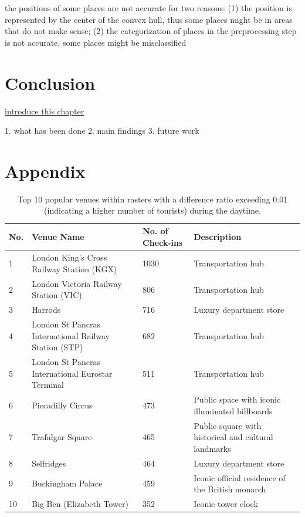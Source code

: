 \documentclass{article}
\theoremstyle{definition}
\theoremstyle{remark}
\begin{document}
the positions of some places are not accurate for two reasons: (1) the position is represented by the center of the convex hull, thus some places might be in areas that do not make sense; (2) the categorization of places in the preprocessing step is not accurate, some places might be misclassified

\clearpage


\section{Conclusion}
\underline{introduce this chapter}

1. what has been done
2. main findings
3. future work


\clearpage






\clearpage


\appendix
\section{Appendix} \label{appendix}
\begin{table}[!h]
\centering
\caption{\label{tab:popular_venues_touristspop_daytime}Top 10 popular venues within rasters with a difference ratio exceeding 0.01 (indicating a higher number of tourists) during the daytime.}
\begin{adjustbox}{max width=\textwidth, margin=0cm}
\begin{threeparttable}
\begin{tabular}{lp{5cm}lp{4cm}} \hline
No. & Venue Name & No. of Check-ins & Description \\ \hline
1 & London King's Cross Railway Station (KGX) & 1030 & Transportation hub \\
2 & London Victoria Railway Station (VIC) & 806 & Transportation hub \\
3 & Harrods & 716 & Luxury department store \\
4 & London St Pancras International Railway Station (STP) & 682 & Transportation hub \\
5 & London St Pancras International Eurostar Terminal & 511 & Transportation hub \\
6 & Piccadilly Circus & 473 & Public space with iconic illuminated billboards \\
7 & Trafalgar Square & 465 & Public square with historical and cultural landmarks \\
8 & Selfridges & 464 & Luxury department store \\
9 & Buckingham Palace & 459 & Iconic official residence of the British monarch \\
10 & Big Ben (Elizabeth Tower) & 352 & Iconic tower clock \\ \hline
\end{tabular}
\end{threeparttable}
\end{adjustbox}
\end{table}
\end{document}
